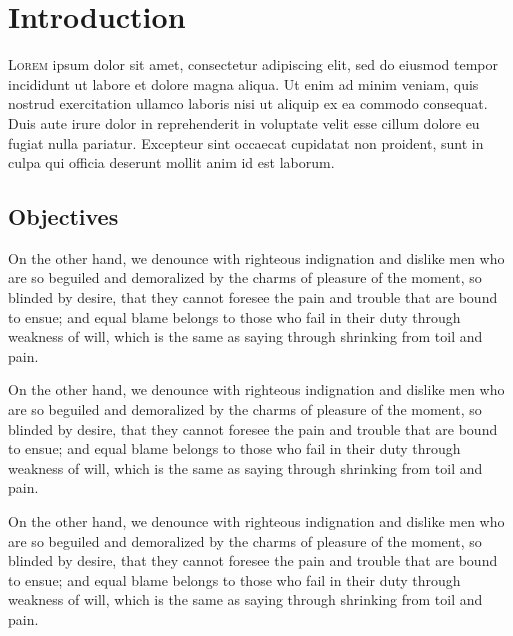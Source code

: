 

\chapter{Introduction}



\lettrine{L}{orem} ipsum dolor sit amet, consectetur
adipiscing elit, sed do eiusmod tempor incididunt ut labore et dolore magna
aliqua. Ut enim ad minim veniam, quis nostrud exercitation ullamco laboris nisi
ut aliquip ex ea commodo consequat. Duis aute irure dolor in reprehenderit in
voluptate velit esse cillum dolore eu fugiat nulla pariatur. Excepteur sint
occaecat cupidatat non proident, sunt in culpa qui officia deserunt mollit anim
id est laborum.


\section{Objectives}

On the other hand, we denounce with righteous indignation and dislike men who
are so beguiled and demoralized by the charms of pleasure of the moment, so
blinded by desire, that they cannot foresee the pain and trouble that are bound
to ensue; and equal blame belongs to those who fail in their duty through
weakness of will, which is the same as saying through shrinking from toil and
pain.

On the other hand, we denounce with righteous indignation and dislike men who
are so beguiled and demoralized by the charms of pleasure of the moment, so
blinded by desire, that they cannot foresee the pain and trouble that are bound
to ensue; and equal blame belongs to those who fail in their duty through
weakness of will, which is the same as saying through shrinking from toil and
pain.

On the other hand, we denounce with righteous indignation and dislike men who
are so beguiled and demoralized by the charms of pleasure of the moment, so
blinded by desire, that they cannot foresee the pain and trouble that are bound
to ensue; and equal blame belongs to those who fail in their duty through
weakness of will, which is the same as saying through shrinking from toil and
pain.

